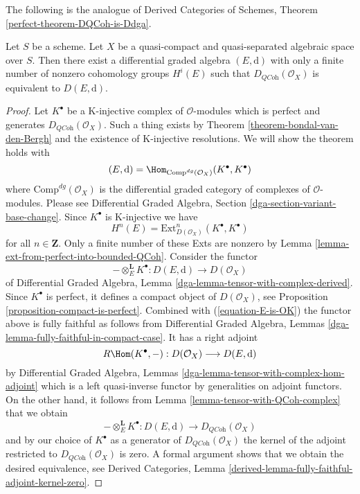 \noindent
The following is the analogue of
Derived Categories of Schemes, Theorem \ref{perfect-theorem-DQCoh-is-Ddga}.

\begin{theorem}
\label{theorem-DQCoh-is-Ddga}
Let $S$ be a scheme.
Let $X$ be a quasi-compact and quasi-separated algebraic space over $S$.
Then there exist a differential graded algebra $(E, \text{d})$
with only a finite number of nonzero cohomology groups $H^i(E)$
such that $D_{\textit{QCoh}}(\mathcal{O}_X)$ is equivalent
to $D(E, \text{d})$.
\end{theorem}

\begin{proof}
Let $K^\bullet$ be a K-injective complex of $\mathcal{O}$-modules which
is perfect and generates $D_{\textit{QCoh}}(\mathcal{O}_X)$. Such a
thing exists by Theorem \ref{theorem-bondal-van-den-Bergh}
and the existence of K-injective resolutions. We will show the
theorem holds with
$$
(E, \text{d}) = \Hom_{\text{Comp}^{dg}(\mathcal{O}_X)}(K^\bullet, K^\bullet)
$$
where $\text{Comp}^{dg}(\mathcal{O}_X)$ is the differential graded category
of complexes of $\mathcal{O}$-modules. Please see
Differential Graded Algebra, Section \ref{dga-section-variant-base-change}.
Since $K^\bullet$ is K-injective we
have
\begin{equation}
\label{equation-E-is-OK}
H^n(E) = \text{Ext}^n_{D(\mathcal{O}_X)}(K^\bullet, K^\bullet)
\end{equation}
for all $n \in \mathbf{Z}$. Only a finite number of these Exts
are nonzero by Lemma \ref{lemma-ext-from-perfect-into-bounded-QCoh}.
Consider the functor
$$
- \otimes_E^\mathbf{L} K^\bullet :
D(E, \text{d}) \longrightarrow D(\mathcal{O}_X)
$$
of
Differential Graded Algebra, Lemma
\ref{dga-lemma-tensor-with-complex-derived}.
Since $K^\bullet$ is perfect, it defines a compact object of
$D(\mathcal{O}_X)$, see Proposition \ref{proposition-compact-is-perfect}.
Combined with (\ref{equation-E-is-OK}) the functor above is fully
faithful as follows from
Differential Graded Algebra, Lemmas
\ref{dga-lemma-fully-faithful-in-compact-case}. It has a right adjoint
$$
R\Hom(K^\bullet, - ) : D(\mathcal{O}_X) \longrightarrow D(E, \text{d})
$$
by Differential Graded Algebra, Lemmas
\ref{dga-lemma-tensor-with-complex-hom-adjoint}
which is a left quasi-inverse functor by generalities on adjoint
functors. On the other hand, it follows from
Lemma \ref{lemma-tensor-with-QCoh-complex} that we obtain
$$
- \otimes_E^\mathbf{L} K^\bullet :
D(E, \text{d}) \longrightarrow D_{\textit{QCoh}}(\mathcal{O}_X)
$$
and by our choice of $K^\bullet$ as a generator of
$D_{\textit{QCoh}}(\mathcal{O}_X)$ the kernel of the adjoint
restricted to $D_{\textit{QCoh}}(\mathcal{O}_X)$ is zero.
A formal argument shows that we obtain the desired equivalence, see
Derived Categories, Lemma
\ref{derived-lemma-fully-faithful-adjoint-kernel-zero}.
\end{proof}










